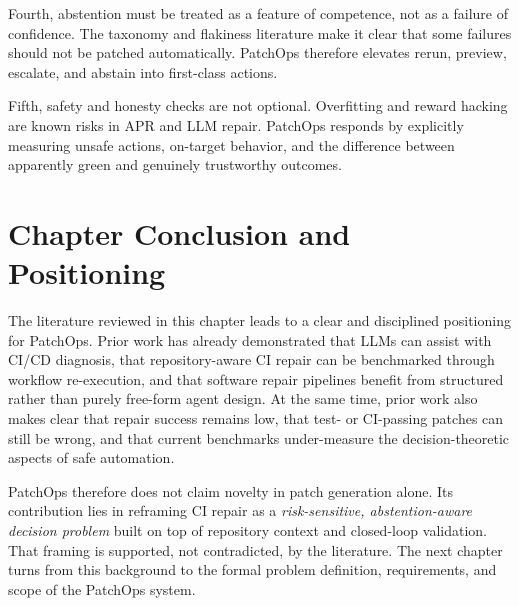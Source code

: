 Fourth, abstention must be treated as a feature of competence, not as a failure of confidence. The taxonomy and
flakiness literature make it clear that some failures should not be patched automatically. PatchOps therefore
elevates rerun, preview, escalate, and abstain into first-class actions.

Fifth, safety and honesty checks are not optional. Overfitting and reward hacking are known risks in APR and
LLM repair. PatchOps responds by explicitly measuring unsafe actions, on-target behavior, and the difference
between apparently green and genuinely trustworthy outcomes.

\section{Chapter Conclusion and Positioning}

The literature reviewed in this chapter leads to a clear and disciplined positioning for PatchOps. Prior work
has already demonstrated that LLMs can assist with CI/CD diagnosis, that repository-aware CI repair can be
benchmarked through workflow re-execution, and that software repair pipelines benefit from structured rather
than purely free-form agent design. At the same time, prior work also makes clear that repair success remains
low, that test- or CI-passing patches can still be wrong, and that current benchmarks under-measure the
decision-theoretic aspects of safe automation.

PatchOps therefore does not claim novelty in patch generation alone. Its contribution lies in reframing CI
repair as a \emph{risk-sensitive, abstention-aware decision problem} built on top of repository context and
closed-loop validation. That framing is supported, not contradicted, by the literature. The next chapter turns
from this background to the formal problem definition, requirements, and scope of the PatchOps system.

